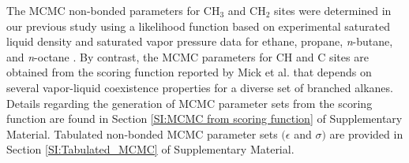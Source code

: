\documentclass[preprint,review,12pt]{elsarticle}
\begin{document}
	The MCMC non-bonded parameters for CH$_3$ and CH$_2$ sites were determined in our previous study using a likelihood function based on experimental saturated liquid density and saturated vapor pressure data for ethane, propane, \textit{n}-butane, and \textit{n}-octane \cite{Postdoc_2}. By contrast, the MCMC parameters for CH and C sites are obtained from the scoring function reported by Mick et al. \cite{Potoff_branched} that depends on several vapor-liquid coexistence properties for a diverse set of branched alkanes. Details regarding the generation of MCMC parameter sets from the scoring function are found in Section \ref{SI:MCMC from scoring function} of Supplementary Material. Tabulated non-bonded MCMC parameter sets $(\epsilon$ and $\sigma)$ are provided in Section \ref{SI:Tabulated_MCMC} of Supplementary Material.
		
	
    
\end{document}
